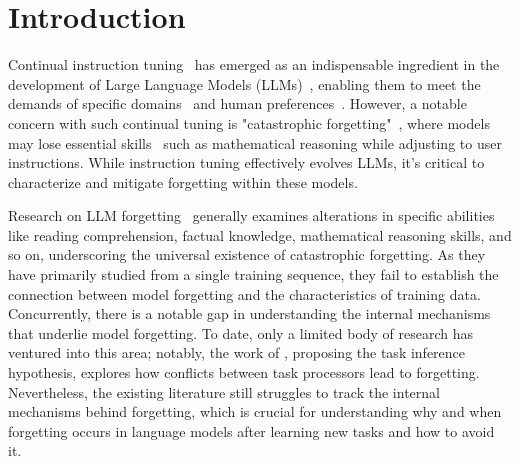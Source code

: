 
\section{Introduction}


Continual instruction tuning~\citep{peng2023instruction, chung2024scaling} has emerged as an indispensable ingredient in the development of Large Language Models (LLMs)~\citep{brown2020language,radford2019language,touvron2023llama}, enabling them to meet the demands of specific domains~\citep{roziere2023code, thirunavukarasu2023large, xue2024famma} and human preferences~\citep{ouyang2022training}. However, a notable concern with such continual tuning is "catastrophic forgetting"~\citep{mccloskey1989catastrophic, Kirkpatrick_2017}, where models may lose essential skills~\citep{dou2023loramoe,chen2023chatgpt} such as mathematical reasoning while adjusting to user instructions. While instruction tuning effectively evolves LLMs, it's critical to characterize and mitigate forgetting within these models.

Research on LLM forgetting~\citep{luo2024empirical, wang2023trace, wu2024llama} generally examines alterations in specific abilities like reading comprehension, factual knowledge, mathematical reasoning skills, and so on, underscoring the universal existence of catastrophic forgetting. As they have primarily studied from a single training sequence, they fail to establish the connection between model forgetting and the characteristics of training data. Concurrently, there is a notable gap in understanding the internal mechanisms that underlie model forgetting. To date, only a limited body of research has ventured into this area; notably, the work of \citet{kotha2024understanding}, proposing the task inference hypothesis, explores how conflicts between task processors lead to forgetting. Nevertheless, the existing literature still struggles to track the internal mechanisms behind forgetting, which is crucial for understanding why and when forgetting occurs in language models after learning new tasks and how to avoid it.



